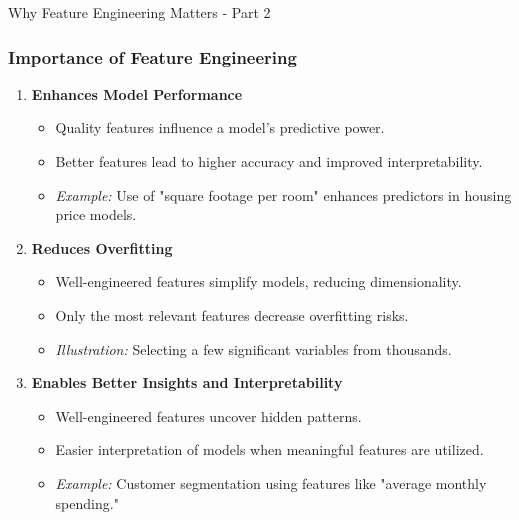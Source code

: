 \documentclass[aspectratio=169]{beamer}
\begin{document}
\begin{frame}[fragile]{Why Feature Engineering Matters - Part 2}
    \frametitle{Importance of Feature Engineering}
    
    \begin{enumerate}
        \item \textbf{Enhances Model Performance}
        \begin{itemize}
            \item Quality features influence a model's predictive power.
            \item Better features lead to higher accuracy and improved interpretability.
            \item \textit{Example:} Use of "square footage per room" enhances predictors in housing price models.
        \end{itemize}

        \item \textbf{Reduces Overfitting}
        \begin{itemize}
            \item Well-engineered features simplify models, reducing dimensionality.
            \item Only the most relevant features decrease overfitting risks.
            \item \textit{Illustration:} Selecting a few significant variables from thousands.
        \end{itemize}
        
        \item \textbf{Enables Better Insights and Interpretability}
        \begin{itemize}
            \item Well-engineered features uncover hidden patterns.
            \item Easier interpretation of models when meaningful features are utilized.
            \item \textit{Example:} Customer segmentation using features like "average monthly spending."
        \end{itemize}
    \end{enumerate}
\end{frame}
\end{document}
